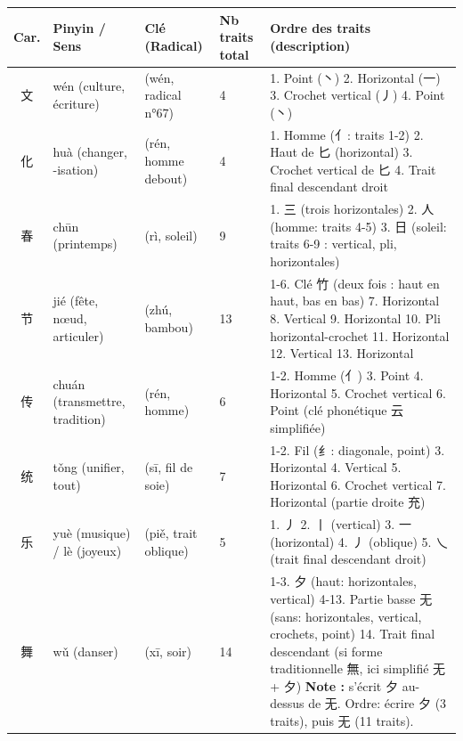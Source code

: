 \documentclass[11pt]{article}
\newcommand{\zh}[1]{\ifmmode\text{#1}\else{#1}\fi}
\begin{document}
\begin{center}
\begin{tabularx}{\linewidth}{|c|X|X|X|X|}
\hline
\rowcolor{poppurpleL} \textbf{Car.} & \textbf{Pinyin / Sens} & \textbf{Clé (Radical)} & \textbf{Nb traits total} & \textbf{Ordre des traits (description)} \\
\hline
文 & wén (culture, écriture) & \zh{文} (wén, radical n°67) & 4 & 1. Point (丶) 2. Horizontal (一) 3. Crochet vertical (丿) 4. Point (丶) \\
\hline
化 & huà (changer, -isation) & \zh{亻} (rén, homme debout) & 4 & 1. Homme (亻: traits 1-2) 2. Haut de 匕 (horizontal) 3. Crochet vertical de 匕 4. Trait final descendant droit \\
\hline
春 & chūn (printemps) & \zh{日} (rì, soleil) & 9 & 1. 三 (trois horizontales) 2. 人 (homme: traits 4-5) 3. 日 (soleil: traits 6-9 : vertical, pli, horizontales) \\
\hline
节 & jié (fête, nœud, articuler) & \zh{竹} (zhú, bambou) & 13 & 1-6. Clé 竹 (deux fois : haut en haut, bas en bas) 7. Horizontal 8. Vertical 9. Horizontal 10. Pli horizontal-crochet 11. Horizontal 12. Vertical 13. Horizontal \\
\hline
传 & chuán (transmettre, tradition) & \zh{亻} (rén, homme) & 6 & 1-2. Homme (亻) 3. Point 4. Horizontal 5. Crochet vertical 6. Point (clé phonétique 云 simplifiée) \\
\hline
统 & tǒng (unifier, tout) & \zh{纟} (sī, fil de soie) & 7 & 1-2. Fil (纟: diagonale, point) 3. Horizontal 4. Vertical 5. Horizontal 6. Crochet vertical 7. Horizontal (partie droite 充) \\
\hline
乐 & yuè (musique) / lè (joyeux) & \zh{丿} (piě, trait oblique) & 5 & 1. 丿 2. 丨 (vertical) 3. 一 (horizontal) 4. 丿 (oblique) 5. 乀 (trait final descendant droit) \\
\hline
舞 & wǔ (danser) & \zh{夕} (xī, soir) & 14 & 1-3. 夕 (haut: horizontales, vertical) 4-13. Partie basse 无 (sans: horizontales, vertical, crochets, point) 14. Trait final descendant (si forme traditionnelle 無, ici simplifié 无 + 夕) \textbf{Note :} \zh{舞} s'écrit 夕 au-dessus de 无. Ordre: écrire 夕 (3 traits), puis 无 (11 traits). \\
\hline
\end{tabularx}
\end{center}
\end{document}
